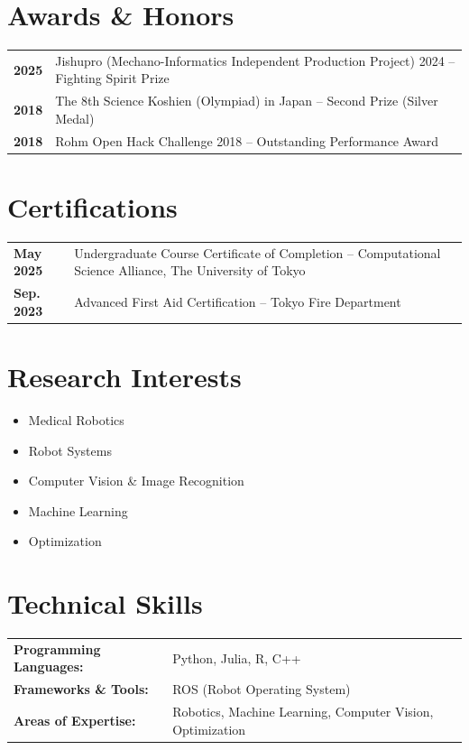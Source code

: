 \documentclass[11pt,a4paper]{article}
\newcommand{\cvitem}[2]{\textbf{#1} & #2 \\[0.3em]}
\begin{document}
\section{Awards \& Honors}
\begin{tabularx}{\textwidth}{@{}p{2.5cm}X@{}}
\cvitem{2025}{Jishupro (Mechano-Informatics Independent Production Project) 2024 -- Fighting Spirit Prize}
\cvitem{2018}{The 8th Science Koshien (Olympiad) in Japan -- Second Prize (Silver Medal)}
\cvitem{2018}{Rohm Open Hack Challenge 2018 -- Outstanding Performance Award}
\end{tabularx}

\section{Certifications}
\begin{tabularx}{\textwidth}{@{}p{2.5cm}X@{}}
\cvitem{May 2025}{Undergraduate Course Certificate of Completion -- Computational Science Alliance, The University of Tokyo}
\cvitem{Sep. 2023}{Advanced First Aid Certification -- Tokyo Fire Department}
\end{tabularx}

\section{Research Interests}
\begin{itemize}[leftmargin=1cm,itemsep=0.2em]
    \item Medical Robotics
    \item Robot Systems
    \item Computer Vision \& Image Recognition
    \item Machine Learning
    \item Optimization
\end{itemize}

\section{Technical Skills}
\begin{tabularx}{\textwidth}{@{}p{4cm}X@{}}
\textbf{Programming Languages:} & Python, Julia, R, C++\\[0.3em]
\textbf{Frameworks \& Tools:} & ROS (Robot Operating System)\\[0.3em]
\textbf{Areas of Expertise:} & Robotics, Machine Learning, Computer Vision, Optimization
\end{tabularx}
\end{document}
